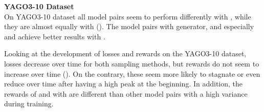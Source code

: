 \textbf{YAGO3-10 Dataset}
\label{subsubsec:methods_yago3_10}\\
%
On \textsc{YAGO3-10} dataset all model pairs seem to perform differently with \usmax, while they are almost equally with \ussoftmax ().
The model pairs with \complex generator, and especially \complex and \transd achieve better results with \usmax.

Looking at the development of losses and rewards on the \textsc{YAGO3-10} dataset, losses decrease over time for both sampling methods, but rewards do not seem to increase over time ().
On the contrary, these seem more likely to stagnate or even reduce over time after having a high peak at the beginning.
In addition, the rewards of \distmult and \transd with \usmax are different than other model pairs with a high variance during training.
\clearpage
